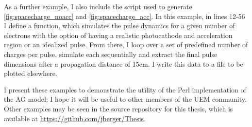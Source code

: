 \begin{singlespace}
  \scriptsize
  
\end{singlespace}

As a further example, I also include the script used to generate \ref{fig:spacecharge_noacc} and \ref{fig:spacecharge_acc}.
In this example, in lines 12-56 I define a function, which simulates the pulse dynamics for a given number of electrons with the option of having a realistic photocathode and acceleration region or an idealized pulse.
From there, I loop over a set of predefined number of charges per pulse, simulate each sequentially and extract the final pulse dimensions after a propagation distance of 15cm.
I write this data to a file to be plotted elsewhere.

\begin{singlespace}
  \scriptsize
  
\end{singlespace}

I present these examples to demonstrate the utility of the Perl implementation of the AG model; I hope it will be useful to other members of the UEM community.
Other examples may be seen in the source repository for this thesis, which is available at \url{https://github.com/jberger/Thesis}.
